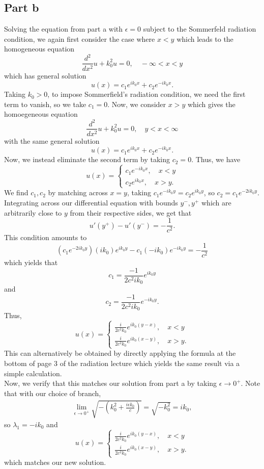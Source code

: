 \documentclass{article}
\begin{document}
\subsection{Part b}
Solving the equation from part a with $\epsilon=0$ subject to the Sommerfeld radiation
condition, we again first consider the case where $x<y$ which leads to the homogeneous equation
\[
\frac{d^2 }{dx^2}u+k_0^2u=0, \quad -\infty<x<y
\] 
which has general solution 
\[
u(x)=c_1e^{ik_0x}+c_2e^{-ik_0x}.
\]
Taking $k_0>0$, to impose Sommerfield's radiation condition, we need the first term to vanish, so we take $c_1=0$. Now, we consider $x>y$ which gives the homoegeneous equation
\[
\frac{d^2 }{dx^2}u+k_0^2u=0, \quad y<x<\infty
\] 
with the same general solution
\[
u(x)=c_1e^{ik_0x}+c_2e^{-ik_0x}.
\]
Now, we instead eliminate the second term by taking $c_2=0$. Thus, we have 
\[
u(x)=\begin{cases}
	c_1e^{-ik_0x}, \quad x<y\\
	c_2e^{ik_0x}, \quad x>y.
\end{cases}
\]
We find $c_1,c_2$ by matching across $x=y$, taking $c_1e^{-ik_0y}=c_2e^{ik_0y}$, so $c_2=c_1e^{-2ik_0y}$. 
Integrating across our differential equation with bounds $y^-,y^+$ which are arbitrarily close to $y$ from their respective sides, we get that 
\[
u'(y^+)-u'(y^-)=-\frac{1}{c^2}.
\]
This condition amounts to 
\[
(c_1e^{-2ik_0y})(ik_0)e^{ik_0y}-c_1(-ik_0)e^{-ik_0y}=-\frac{1}{c^2}
\]
which yields that 
\[
c_1=\frac{-1}{2c^2ik_0}e^{ik_0y}
\]
and 
\[
c_2=\frac{-1}{2c^2ik_0}e^{-ik_0y}.
\]
Thus,
\[
u(x)=\begin{cases}
	\frac{i}{2c^2k_0}e^{ik_0(y-x)}, \quad x<y\\
	\frac{i}{2c^2k_0}e^{ik_0(x-y)}, \quad x>y.
\end{cases}
\]
This can alternatively be obtained by directly applying the formula at the bottom of page 3 of the radiation lecture which yields the same result via a simple calculation.\\
Now, we verify that this matches our solution from part a by taking $\epsilon\to0^+$. Note that with our choice of branch,
\begin{align*}
\lim_{\epsilon\to0^+}\sqrt{-\left(k_0^2+\frac{i\epsilon k_0}{c}\right)}=\sqrt{-k_0^2}=ik_0,
\end{align*}
so $\lambda_1=-ik_0$ and 
\[
u(x)=\begin{cases}
	\frac{i}{2c^2k_0}e^{ik_0(y-x)}, \quad x<y\\
	\frac{i}{2c^2k_0}e^{ik_0(x-y)}, \quad x>y.
\end{cases}
\]
which matches our new solution.
\end{document}
